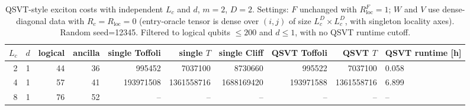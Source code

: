 \begin{table}[t]
\centering
\scriptsize
\caption{QSVT-style exciton costs with independent $L_c$ and $d$, $m = 2$, $D = 2$. Settings: $F$ unchanged with $R_{\mathrm{loc}}^F = 1$; $W$ and $V$ use dense-diagonal data with $R_c = R_{\mathrm{loc}} = 0$ (entry-oracle tensor is dense over $(i, j)$ of size $L_c^D \times L_c^D$, with singleton locality axes). Random seed=12345. Filtered to logical qubits $\leq 200$ and $d \leq 1$, with no QSVT runtime cutoff.}
\begin{tabularx}{\linewidth}{rrrrrrrrr}
\toprule
$L_c$ & $d$ & logical & ancilla & single Toffoli & single $T$ & single Cliff & QSVT Toffoli & QSVT $T$ & QSVT runtime [h] \\
 & 1 & 44 & 36 & 995452 & 7037100 & 8730660 & 995522 & 7037100 & 0.058 \\
4 & 1 & 57 & 41 & 193971508 & 1361558716 & 1688169420 & 193971588 & 1361558716 & 6.899 \\
8 & 1 & 76 & 52 & -- & -- & -- & -- & -- & -- \\
\bottomrule
\end{tabularx}
\end{table}
